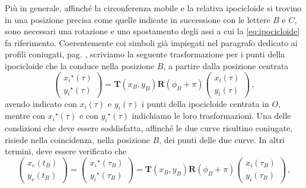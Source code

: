 Pi\`u in generale, affinch\'e la circonferenza mobile e la relativa ipocicloide
si trovino in una posizione precisa come quelle indicate 
in successione con le lettere
$B$ e $C$, sono necessari una rotazione  e uno spostamento
degli assi a cui la \ref{eq:ipocicloide} fa riferimento.
Coerentemente coi simboli gi\`a impiegati nel paragrafo dedicato
ai profili coniugati, pag. \pageref{prof_con}, scriviamo la seguente
trasformazione per i punti della ipocicloide che la conduce nella 
posizione $B$, a partire dalla posizione centrata
\begin{equation}
\begin{pmatrix} {x_i}^\star\left(\tau\right)\\{y_i}^\star\left(\tau\right) \end{pmatrix}
={\bm T}(x_{\scriptscriptstyle B}, y_{\scriptscriptstyle B}){\bm R}(\phi_{\scriptscriptstyle B} +\pi)
\begin{pmatrix} {x_i}\left(\tau\right)\\{y_i}\left(\tau\right) \end{pmatrix}\,,
 \label{eq:rot_trasl_i}
\end{equation}
\noindent avendo indicato con ${x_i}\left(\tau\right)$ e ${y_i}\left(\tau\right)$
 i punti della ipocicloide centrata in $O$, mentre con
${x_i}^\star\left(\tau\right)$ e con ${y_i}^\star\left(\tau\right)$
indichiamo le loro trasformazioni.
Una delle condizioni che deve essere soddisfatta,
affinch\'e le due curve risultino coniugate, risiede 
nella coincidenza, nella posizione $B$, dei punti delle due curve.
In altri termini, deve essere verificato che
\begin{equation}
\begin{pmatrix} {x_e}\left(t_{\scriptscriptstyle B}\right)\\{y_e}\left(t_{\scriptscriptstyle B}\right) \end{pmatrix}=
\begin{pmatrix} {x_i}^\star\left(\tau_{\scriptscriptstyle B}\right)\\{y_i}^\star\left(\tau_{\scriptscriptstyle B}\right)
\end{pmatrix}
={\bm T}(x_{\scriptscriptstyle B}, y_{\scriptscriptstyle B}){\bm R}(\phi_{\scriptscriptstyle B} +\pi)
\begin{pmatrix} {x_i}\left(\tau_{\scriptscriptstyle B}\right)\\{y_i}\left(\tau_{\scriptscriptstyle B}\right)
\end{pmatrix}\,,
 \label{eq:rot_trasl_ei}
\end{equation}
